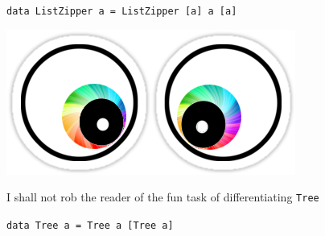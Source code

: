 \begin{frame}
\begin{center}
\lstinline{data ListZipper a = ListZipper [a] a [a]}
\end{center}

\vspace{1cm}

\begin{center}
\includegraphics[width=0.3\textheight]{image/crosseyed-swirl.png}
\end{center}

\begin{center}
I shall not rob the reader of the fun task of differentiating \lstinline{Tree}

\lstinline{data Tree a = Tree a [Tree a]}

\end{center}

\end{frame}
